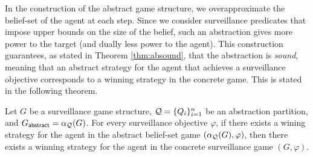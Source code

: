 In the construction of the abstract  game structure, we overapproximate the belief-set of the agent at each step. Since we consider surveillance predicates that impose upper bounds on the size of the belief, such an abstraction  gives more power to the target (and dually less power to the agent). This construction guarantees, as stated in Theorem \ref{thm:absound}, that the abstraction is \emph{sound}, meaning that an abstract strategy for the agent that achieves a surveillance objective corresponds to a winning strategy in the concrete game. This is stated in the following theorem.

\begin{theorem}\label{thm:absound}
Let $G$ be a surveillance game structure, $\mathcal{Q} = \{Q_i\}_{i=1}^n$ be an abstraction partition, and $G_{\mathsf{abstract}} = \alpha_{\mathcal{Q}}(G)$. For every surveillance objective $\varphi$, if there exists a wining strategy for the agent in the abstract belief-set game $(\alpha_{\mathcal{Q}}(G),\varphi)$, then there exists a winning strategy for the agent in the concrete surveillance game $(G,\varphi)$.
\end{theorem}

